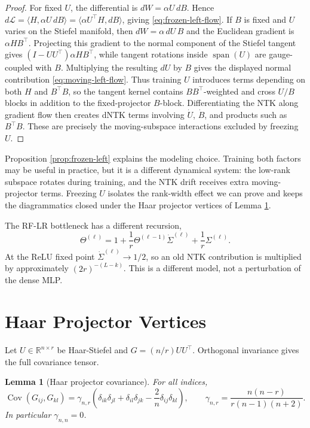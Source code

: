\documentclass{article}
\newtheorem{lemma}[theorem]{Lemma}
\newcommand{\R}{\mathbb R}
\newcommand{\Cov}{\operatorname{Cov}}
\begin{document}
\begin{proof}
For fixed \(U\), the differential is \(dW=\alpha U\,dB\). Hence \(d\mathcal L=\langle H,\alpha U\,dB\rangle=\langle \alpha U^\top H,dB\rangle\), giving \eqref{eq:frozen-left-flow}. If \(B\) is fixed and \(U\) varies on the Stiefel manifold, then \(dW=\alpha\,dU\,B\) and the Euclidean gradient is \(\alpha HB^\top\). Projecting this gradient to the normal component of the Stiefel tangent gives \((I-UU^\top)\alpha HB^\top\), while tangent rotations inside \(\operatorname{span}(U)\) are gauge-coupled with \(B\). Multiplying the resulting \(dU\) by \(B\) gives the displayed normal contribution \eqref{eq:moving-left-flow}. Thus training \(U\) introduces terms depending on both \(H\) and \(B^\top B\), so the tangent kernel contains \(BB^\top\)-weighted and cross \(U/B\) blocks in addition to the fixed-projector \(B\)-block. Differentiating the NTK along gradient flow then creates dNTK terms involving \(\dot U\), \(\dot B\), and products such as \(B^\top B\). These are precisely the moving-subspace interactions excluded by freezing \(U\).
\end{proof}

Proposition \ref{prop:frozen-left} explains the modeling choice. Training both factors may be useful in practice, but it is a different dynamical system: the low-rank subspace rotates during training, and the NTK drift receives extra moving-projector terms. Freezing \(U\) isolates the rank-width effect we can prove and keeps the diagrammatics closed under the Haar projector vertices of Lemma \ref{lem:haar-cov}.

The RF-LR bottleneck has a different recursion,
\begin{equation}
\Theta^{(\ell)}=1+\frac1r\Theta^{(\ell-1)}\dot\Sigma^{(\ell)}+\frac1r\Sigma^{(\ell)}.
\label{eq:rflr-recursion}
\end{equation}
At the ReLU fixed point \(\dot\Sigma^{(\ell)}\to1/2\), so an old NTK contribution is multiplied by approximately \((2r)^{-(L-k)}\). This is a different model, not a perturbation of the dense MLP.

\section{Haar Projector Vertices}
Let \(U\in\R^{n\times r}\) be Haar-Stiefel and \(G=(n/r)UU^\top\). Orthogonal invariance gives the full covariance tensor.

\begin{lemma}[Haar projector covariance]
\label{lem:haar-cov}
For all indices,
\begin{equation}
\Cov(G_{ij},G_{kl})=\gamma_{n,r}\left(\delta_{ik}\delta_{jl}+\delta_{il}\delta_{jk}-\frac2n\delta_{ij}\delta_{kl}\right),
\qquad
\gamma_{n,r}=\frac{n(n-r)}{r(n-1)(n+2)}.
\label{eq:haar-cov}
\end{equation}
In particular \(\gamma_{n,n}=0\).
\end{lemma}
\end{document}
